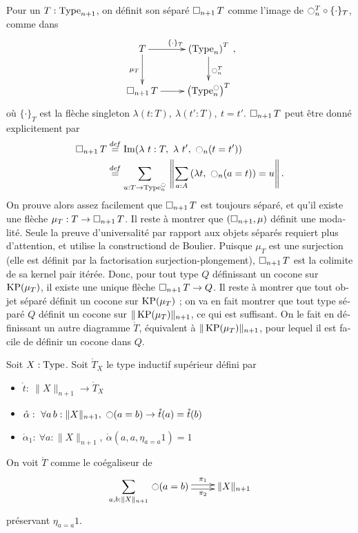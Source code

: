 \begin{otherlanguage}{french}
Pour un $T:\operatorname{Type}_{n+1}$, on définit son séparé $\mathop{\square_{n+1}} T$ comme
l'image de $\ocircle_n^T \circ \{\cdot\}_T$, comme dans
\[\xymatrix{
    T \ar[r]^{\{\cdot\}_T} \ar[d]_{\mu_T} & \left(\Type_n\right)^T \ar[d]^{\modal_n^T} \\
  \separated T \ar[r]& \left( \Type_n^\modal \right)^T
}, \]%
où $\{\cdot\}_T$ est la flèche singleton $\lambda (t:T),~\lambda
(t':T),~t=t'$. 
%
$\mathop{\square_{n+1}} T$ peut être donné explicitement par
%
\begin{align*}
\mathop{\square_{n+1}} T &\overset{de\hspace{-0.2ex}f}{=} \operatorname{Im} (\lambda~t:T,~\lambda~ t',~ \ocircle_n (t = t')) \\
          &\overset{de\hspace{-0.2ex}f}{=} \sum_{u:T \to \operatorname{Type}_n^{\ocircle}}\, \left\| \sum_{a:A}\, (\lambda t,~\ocircle_n (a=t)) = u\right\|.
\end{align*}
%
On prouve alors assez facilement que $\mathop{\square_{n+1}} T$ est toujours
séparé, et qu'il existe une flèche $\mu_T:T\to\mathop{\square_{n+1}} T$. Il reste à
montrer que $(\mathop{\square_{n+1}},\mu)$ définit une modalité. 
Seule la preuve d'universalité par rapport aux objets séparés requiert
plus d'attention, et utilise la constructiond de Boulier.
Puisque $\mu_T$ est une surjection (elle est définit par la
factorisation surjection-plongement), $\mathop{\square_{n+1}} T$ est la colimite
de sa kernel pair itérée. Donc, pour tout type $Q$ définissant un
cocone sur $\operatorname{KP}(\mu_T)$, il existe une unique flèche $\mathop{\square_{n+1}} T\to
Q$. Il reste à montrer que tout objet séparé définit un cocone sur
$\operatorname{KP}(\mu_T)$ ; on va en fait montrer que tout type séparé $Q$ définit
un cocone sur $\|\operatorname{KP}(\mu_T)\|_{n+1}$, ce qui est suffisant. On le fait
en définissant un autre diagramme $\mathring T$, équivalent à
$\|\operatorname{KP}(\mu_T)\|_{n+1}$, pour lequel il est facile de définir un cocone
dans $Q$.

\begin{defifr}
  Soit $X:\operatorname{Type}$. Soit $\mathring T_X$ le type inductif supérieur
  défini par
  \begin{itemize}
  \item $\mathring t:~\|X\|_{n+1} \to \mathring T_X$
  \item $\mathring \alpha:~\forall a\, b:\|X\|_{n+1},~\ocircle (a=b) \to
    \mathring t(a) = \mathring t(b)$
  \item $\mathring \alpha_1:~\forall a:\|X\|_{n+1},~
    \mathring \alpha(a , a, \eta_{a=a} 1) = 1$
  \end{itemize}

  On voit $\mathring T$ comme le coégaliseur de
  \[
    \xymatrix{\displaystyle{\sumD {a,b}{\|X\|_{n+1}} {\modal (a=b)}} \ar@<-.5ex>[r]_-{\pi_2} \ar@<.5ex>[r]^-{\pi_1}
      & \|X\|_{n+1}
    }\]%
  préservant $\eta_{a=a} 1$.


\end{defifr}
\end{otherlanguage}
